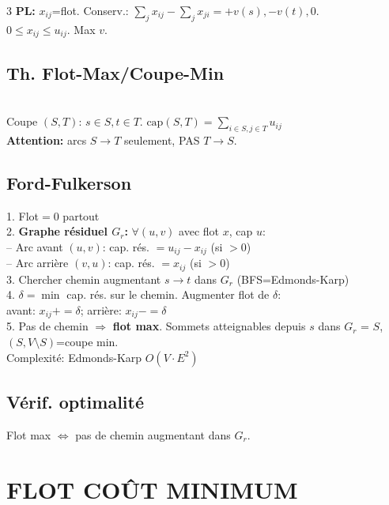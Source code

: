 \documentclass[a4paper,4pt]{article}
\begin{document}
\begin{multicols}{3}
\textbf{PL:} $x_{ij}$=flot. Conserv.: $\sum_j x_{ij}-\sum_j x_{ji}=+v(s),-v(t),0$.\\
$0\leq x_{ij}\leq u_{ij}$. Max $v$.

\subsection{Th. Flot-Max/Coupe-Min}
{\color{red}}\\
Coupe $(S,T)$: $s\in S, t\in T$. $\text{cap}(S,T)=\sum_{i\in S,j\in T}u_{ij}$\\
\textbf{Attention:} arcs $S\to T$ seulement, PAS $T\to S$.

\subsection{Ford-Fulkerson}
1. Flot$=0$ partout\\
2. \textbf{Graphe r\'esiduel $G_r$:} $\forall (u,v)$ avec flot $x$, cap $u$:\\
\hspace{4pt}-- Arc avant $(u,v)$: cap. r\'es. $=u_{ij}-x_{ij}$ (si $>0$)\\
\hspace{4pt}-- Arc arri\`ere $(v,u)$: cap. r\'es. $=x_{ij}$ (si $>0$)\\
3. Chercher chemin augmentant $s\to t$ dans $G_r$ (BFS=Edmonds-Karp)\\
4. $\delta=\min$ cap. r\'es. sur le chemin. Augmenter flot de $\delta$:\\
\hspace{4pt}avant: $x_{ij}+=\delta$; arri\`ere: $x_{ij}-=\delta$\\
5. Pas de chemin $\Rightarrow$ \textbf{flot max}. Sommets atteignables depuis $s$ dans $G_r$ = $S$, $(S,V\setminus S)$=coupe min.\\
Complexit\'e: Edmonds-Karp $O(V{\cdot}E^2)$

\subsection{V\'erif. optimalit\'e}
Flot max $\Leftrightarrow$ pas de chemin augmentant dans $G_r$.

\section{FLOT CO\^UT MINIMUM}


\end{multicols}
\end{document}
